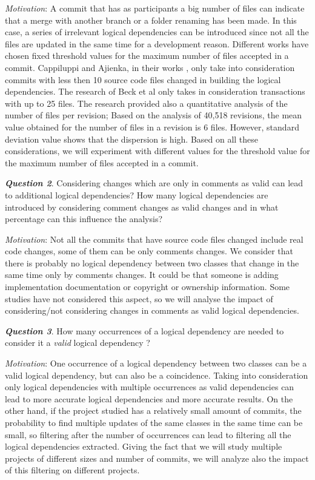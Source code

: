 \documentclass[a4paper,twoside]{article}
\begin{document}
\textit{Motivation}: A commit that has as participants a big number of files can indicate that a merge with another branch or a folder renaming has been made. In this case, a series of irrelevant logical dependencies can be introduced since not all the files are updated in the same time for a development reason. Different works have chosen fixed threshold values for the maximum number of files accepted in a commit. Cappiluppi and Ajienka, in their works \cite{DBLP:journals/jss/AjienkaC17}, \cite{DBLP:journals/ese/AjienkaCC18} only take into consideration commits with less then 10 source code files changed in building the logical dependencies. The research of Beck et al \cite{Beck:2011:CMC:2025113.2025162} only takes in consideration transactions with up to 25 files. The research \cite{Oliva:2011:ISL:2067853.2068086} provided also a quantitative analysis of the number of files per revision; Based on the analysis of  40,518 revisions, the mean value obtained for the number of files in a revision is 6 files. However, standard deviation value shows that the dispersion is high. Based on all these considerations, we will experiment with different values for the threshold value for the maximum number of files accepted in a commit. 



\textit{\textbf{Question 2}}. Considering changes which are only in comments as valid can lead to additional logical dependencies? How many logical dependencies are introduced by considering comment changes as valid changes and in what percentage can this influence the analysis?

\textit{Motivation}: Not all the commits that have source code files changed include real code changes, some of them can be only comments changes. We consider that there is probably no logical dependency between two classes that change in the same time only by comments changes. It could be that someone is adding implementation documentation or copyright or ownership information. Some studies have not considered this aspect, so we will analyse the impact of considering/not considering changes in  comments as valid logical dependencies. 


\textit{\textbf{Question 3}}. How many occurrences of a logical dependency are needed to consider it a \textit{valid} logical dependency ? 

\textit{Motivation}: One occurrence of a logical dependency between two classes can be a valid logical dependency, but can also be a coincidence. Taking into consideration only logical dependencies with multiple occurrences as valid dependencies can lead to more accurate logical dependencies and more accurate results. On the other hand, if the project studied has a relatively small amount of commits, the probability to find multiple updates of the same classes in the same time can be small, so filtering after the number of occurrences can lead to filtering all the logical dependencies extracted. Giving the fact that we will study multiple projects of different sizes and number of commits, we will analyze also the impact of this filtering on different projects.
\end{document}
